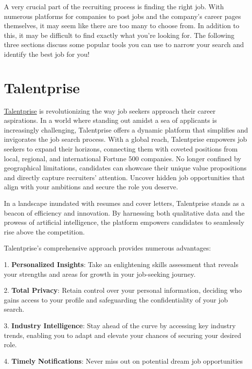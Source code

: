 \documentclass[
]{book}
\begin{document}
A very crucial part of the recruiting process is finding the right job. With numerous platforms for companies to post jobs and the company's career pages themselves, it may seem like there are too many to choose from. In addition to this, it may be difficult to find exactly what you're looking for. The following three sections discuss some popular tools you can use to narrow your search and identify the best job for you!

\hypertarget{talentprise}{%
\section{Talentprise}\label{talentprise}}

\href{https://www.talentprise.com/}{Talentprise} is revolutionizing the way job seekers approach their career aspirations. In a world where standing out amidst a sea of applicants is increasingly challenging, Talentprise offers a dynamic platform that simplifies and invigorates the job search process. With a global reach, Talentprise empowers job seekers to expand their horizons, connecting them with coveted positions from local, regional, and international Fortune 500 companies. No longer confined by geographical limitations, candidates can showcase their unique value propositions and directly capture recruiters' attention. Uncover hidden job opportunities that align with your ambitions and secure the role you deserve.

In a landscape inundated with resumes and cover letters, Talentprise stands as a beacon of efficiency and innovation. By harnessing both qualitative data and the prowess of artificial intelligence, the platform empowers candidates to seamlessly rise above the competition.

Talentprise's comprehensive approach provides numerous advantages:

1. \textbf{Personalized Insights}: Take an enlightening skills assessment that reveals your strengths and areas for growth in your job-seeking journey.

2. \textbf{Total Privacy}: Retain control over your personal information, deciding who gains access to your profile and safeguarding the confidentiality of your job search.

3. \textbf{Industry Intelligence}: Stay ahead of the curve by accessing key industry trends, enabling you to adapt and elevate your chances of securing your desired role.

4. \textbf{Timely Notifications}: Never miss out on potential dream job opportunities
\end{document}
